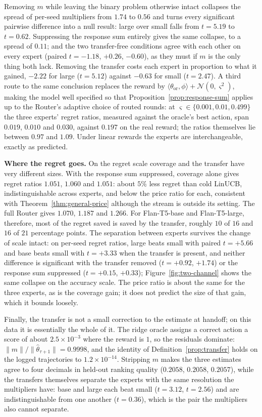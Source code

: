 \documentclass{article}
\theoremstyle{definition}
\theoremstyle{remark}
\theoremstyle{remark}
\begin{document}
Removing $m$ while leaving the binary problem otherwise intact collapses the
spread of per-seed multipliers from $1.74$ to $0.56$ and turns every
significant pairwise difference into a null result: large over small falls
from $t=5.19$ to $t=0.62$. Suppressing the response sum entirely gives the
same collapse, to a spread of $0.11$; and the two transfer-free conditions
agree with each other on every expert (paired $t=-1.18$, $+0.26$, $-0.60$),
as they must if $m$ is the only thing both lack. Removing the transfer costs
each expert in proportion to what it gained, $-2.22$ for large ($t=5.12$)
against $-0.63$ for small ($t=2.47$). A third route to the same conclusion
replaces the reward by $\langle\theta_{\mathrm{or}},\phi\rangle+\mathcal
N(0,\varsigma^2)$, making the model well specified so that
Proposition~\ref{prop:response-sum} applies up to the Router's adaptive
choice of routed rounds: at
$\varsigma\in\{0.001,0.01,0.499\}$ the three experts' regret ratios, measured
against the oracle's best action, span $0.019$, $0.010$ and $0.030$, against
$0.197$ on the real reward; the ratios themselves lie between $0.97$ and
$1.09$. Under linear rewards the experts are interchangeable, exactly as
predicted.

\textbf{Where the regret goes.} On the regret scale coverage and the transfer
have very different sizes. With the response sum suppressed, coverage alone gives
regret ratios $1.051$, $1.060$ and $1.051$: about $5\%$ less regret than cold
LinUCB, indistinguishable across experts, and below the price ratio for each,
consistent with Theorem~\ref{thm:general-price} although the stream is outside
its setting. The full Router gives $1.070$, $1.187$ and $1.266$. For
Flan-T5-base and Flan-T5-large, therefore, most of the regret saved is saved
by the transfer, roughly $10$ of $16$ and $16$ of $21$ percentage points. The
separation between experts survives the change of scale intact: on per-seed
regret ratios, large beats small with paired $t=+5.66$ and base beats small
with $t=+3.33$ when the transfer is present, and neither difference is
significant with the transfer removed ($t=+0.92$, $+1.74$) or the response sum
suppressed ($t=+0.15$, $+0.33$); Figure~\ref{fig:two-channel} shows the same
collapse on the accuracy scale. The price ratio is about the same for the
three experts, as is the coverage gain; it does not predict the size of that
gain, which it bounds loosely.

Finally, the transfer is not a small correction to the estimate at handoff; on
this data it is essentially the whole of it. The ridge oracle assigns a
correct action a score of about $2.5\times10^{-3}$ where the reward is $1$, so
the residuals dominate: $\|m\|/\|\widehat\theta_{\tau+1}\|=0.9998$, and the
identity of Definition~\ref{prop:transfer} holds on the logged trajectories
to $1.2\times10^{-14}$. Stripping $m$ makes the three estimates agree to four
decimals in held-out ranking quality ($0.2058$, $0.2058$, $0.2057$), while the
transfers themselves separate the experts with the same resolution the
multipliers have: base and large each beat small ($t=3.12$, $t=2.56$) and are
indistinguishable from one another ($t=0.36$), which is the pair the
multipliers also cannot separate.
\end{document}
